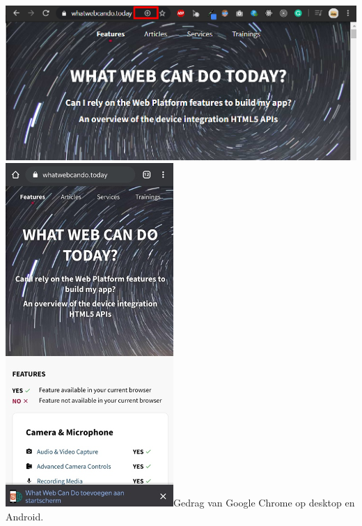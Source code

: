 \includegraphics{./img/beforeinstallprompt_windows.png}
\includegraphics{./img/beforeinstallprompt_android.png}{Gedrag van Google Chrome op desktop en Android.}



